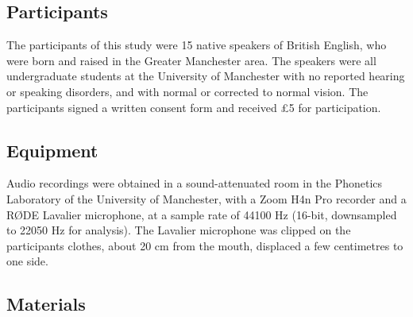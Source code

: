 \documentclass[
  12pt,
  a4paper,
]{article}
\begin{document}
\hypertarget{participants}{%
\subsection{Participants}\label{participants}}

The participants of this study were 15 native speakers of British
English, who were born and raised in the Greater Manchester area. The
speakers were all undergraduate students at the University of Manchester
with no reported hearing or speaking disorders, and with normal or
corrected to normal vision. The participants signed a written consent
form and received £5 for participation.

\hypertarget{equipment}{%
\subsection{Equipment}\label{equipment}}

Audio recordings were obtained in a sound-attenuated room in the
Phonetics Laboratory of the University of Manchester, with a Zoom H4n
Pro recorder and a RØDE Lavalier microphone, at a sample rate of 44100
Hz (16-bit, downsampled to 22050 Hz for analysis). The Lavalier
microphone was clipped on the participants clothes, about 20 cm from the
mouth, displaced a few centimetres to one side.

\hypertarget{materials}{%
\subsection{Materials}\label{materials}}

\end{document}

